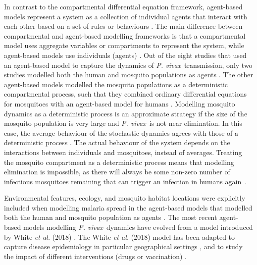 \documentclass[12pt]{article}
\newcommand{\pv}{\textit{P. vivax}}
\newcommand{\etal}{\textit{et al. }}
\begin{document}
In contrast to the compartmental differential equation framework, agent-based models represent a system as a collection of individual agents that interact with each other based on a set of rules or behaviours \cite{volker2005individual,bonabeau2002agent}. The main difference between compartmental and agent-based modelling frameworks is that a compartmental model uses aggregate variables or compartments to represent the system, while agent-based models use individuals (agents) \cite{volker2005individual}. 
Out of the eight studies that used an agent-based model to capture the dynamics of \pv~transmission, only two studies modelled both the human and mosquito populations as agents \cite{pizzitutti2015validated,gharakhanlou2019developing}. The other agent-based models modelled the mosquito populations as a deterministic compartmental process, such that they combined ordinary differential equations for mosquitoes with an agent-based model for humans \cite{white2018mathematical, huber2021radical,nekkab2021estimated,obadia2022developing,white2022potential,walker2023model,nekkab2023accelerating}. Modelling mosquito dynamics as a deterministic process is an approximate strategy if the size of the mosquito population is very large and \pv~is not near elimination. In this case, the average behaviour of the stochastic dynamics agrees with those of a deterministic process \cite{mohd2022revisiting,bonabeau2002agent,yao2015law}. The actual behaviour of the system depends on the interactions between individuals and mosquitoes, instead of averages. Treating the mosquito compartment as a deterministic process means that modelling elimination is impossible, as there will always be some non-zero number of infectious mosquitoes remaining that can trigger an infection in humans again~\cite{walker2023model}.

Environmental features, ecology, and mosquito habitat locations were explicitly included when modelling malaria spread in the agent-based models that modelled both the human and mosquito population as agents \cite{pizzitutti2015validated,gharakhanlou2019developing}. The most recent agent-based models modelling \pv~dynamics \cite{ huber2021radical,nekkab2021estimated,obadia2022developing,white2022potential,nekkab2023accelerating} have evolved from a model introduced by White \etal(2018) \cite{white2018mathematical}. The White \etal(2018) \cite{white2018mathematical} model has been adapted to capture disease epidemiology in particular geographical settings \cite{nekkab2021estimated}, and to study the impact of different interventions (drugs or vaccination) \cite{huber2021radical,white2022potential,nekkab2023accelerating}. 
\end{document}
